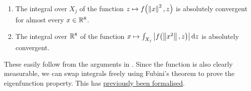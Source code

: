     \begin{enumerate}
        \item The integral over $X_j$ of the function $z \mapsto f\!\left( \left\lVert x \right\rVert^2, z \right)$ is absolutely convergent for almost every $x \in \mathbb{R}^8$.
        \item The integral over $\mathbb{R}^8$ of the function $x 
        \mapsto \int_{X_j} \left\lvert f\!\left( \left\lVert x^2 \right\rVert, z \right) \right\rvert \operatorname{d}\!{z}$ is absolutely convergent.
    \end{enumerate}
    These easily follow from the arguments in . Since the function is also clearly measurable, we can swap integrals freely using Fubini's theorem to prove the eigenfunction property. This has \href{https://github.com/leanprover-community/mathlib4/blob/c38c7fde32656c7fa1b2471ed1ae0d50a600f089/Mathlib/MeasureTheory/Integral/Prod.lean#L486-L489}{previously been formalised}.

